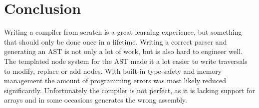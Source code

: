 \documentclass[12pt]{article}
\begin{document}
\section{Conclusion}

Writing a compiler from scratch is a great learning experience, but something that should only be done once in a lifetime. Writing a correct parser and generating an AST is not only a lot of work, but is also hard to engineer well. 
The templated node system for the AST made it a lot easier to write traversals to modify, replace or add nodes. With built-in type-safety and memory management the amount of programming errors was most likely reduced significantly.
Unfortunately the compiler is not perfect, as it is lacking support for arrays and in some occasions generates the wrong assembly.

\newpage



\end{document}
